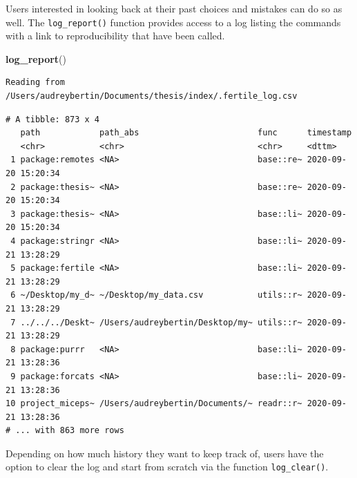\documentclass[12pt,twoside]{reedthesis}
\newenvironment{Shaded}{\begin{snugshade}}{\end{snugshade}}
\newcommand{\KeywordTok}[1]{\textcolor[rgb]{0.13,0.29,0.53}{\textbf{#1}}}
\newcommand{\NormalTok}[1]{#1}
\begin{document}
Users interested in looking back at their past choices and mistakes can do so as well. The \texttt{log\_report()} function provides access to a log listing the commands with a link to reproducibility that have been called.
\begin{Shaded}
\begin{Highlighting}[]
\KeywordTok{log_report}\NormalTok{()}
\end{Highlighting}
\end{Shaded}
\footnotesize
\begin{verbatim}
Reading from /Users/audreybertin/Documents/thesis/index/.fertile_log.csv
\end{verbatim}
\begin{verbatim}
# A tibble: 873 x 4
   path            path_abs                        func      timestamp          
   <chr>           <chr>                           <chr>     <dttm>             
 1 package:remotes <NA>                            base::re~ 2020-09-20 15:20:34
 2 package:thesis~ <NA>                            base::re~ 2020-09-20 15:20:34
 3 package:thesis~ <NA>                            base::li~ 2020-09-20 15:20:34
 4 package:stringr <NA>                            base::li~ 2020-09-21 13:28:29
 5 package:fertile <NA>                            base::li~ 2020-09-21 13:28:29
 6 ~/Desktop/my_d~ ~/Desktop/my_data.csv           utils::r~ 2020-09-21 13:28:29
 7 ../../../Deskt~ /Users/audreybertin/Desktop/my~ utils::r~ 2020-09-21 13:28:29
 8 package:purrr   <NA>                            base::li~ 2020-09-21 13:28:36
 9 package:forcats <NA>                            base::li~ 2020-09-21 13:28:36
10 project_miceps~ /Users/audreybertin/Documents/~ readr::r~ 2020-09-21 13:28:36
# ... with 863 more rows
\end{verbatim}
\normalsize

Depending on how much history they want to keep track of, users have the option to clear the log and start from scratch via the function \texttt{log\_clear()}.
\end{document}
